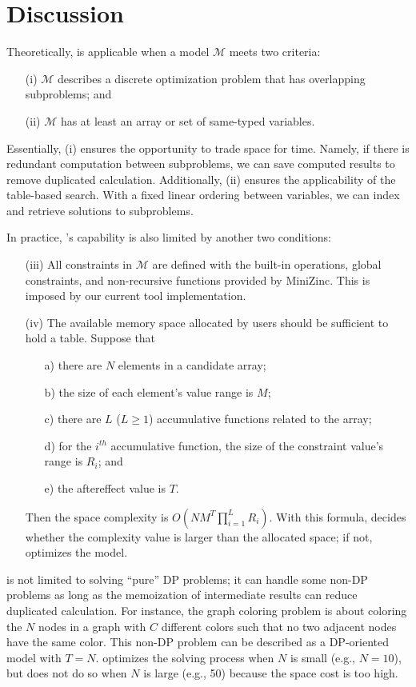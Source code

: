 \section{Discussion}

Theoretically, \tool is applicable when a model $\mathcal{M}$ meets two criteria:

\begin{enumerate}
\item[(i)] $\mathcal{M}$ describes a discrete optimization problem that has overlapping subproblems; and
\item[(ii)] $\mathcal{M}$ has at least an array or set of same-typed variables.
\end{enumerate}
Essentially, (i) ensures the opportunity to trade space for time. Namely, if there is redundant computation between subproblems, we can save computed results to remove duplicated calculation.
Additionally, (ii) ensures the applicability of the table-based search. With a fixed linear ordering between variables, we can index and retrieve solutions to subproblems.


In practice, \tool’s capability is also limited by another two conditions:

\begin{enumerate}
\item[(iii)] All constraints in $\mathcal{M}$ are defined with the built-in operations, global constraints, and non-recursive functions provided by MiniZinc. This is imposed by our current tool implementation.
\item[(iv)] The available memory space allocated by users should be sufficient to hold a table. Suppose that
\begin{itemize}
\item[a)] there are $N$ elements in a candidate array;
\item[b)] the size of each element's value range is $M$;
\item[c)] there are $L$ ($L \geq 1$) accumulative functions related to the array;
\item[d)] for the $i^{th}$ accumulative function, the size of the constraint value's range is $R_i$; and
\item[e)] the aftereffect value is $T$.
\end{itemize}
Then the space complexity is $O(N M^T \prod\limits_{i=1}^L R_i)$. With this formula, \tool decides whether the complexity value is larger than the allocated space; if not, \tool optimizes the model.
\end{enumerate}
\tool is not limited to solving ``pure'' DP problems; 
it can handle some non-DP problems as long as the memoization of intermediate results can reduce duplicated calculation. 
For instance, the graph coloring problem is about coloring the $N$ nodes in a graph with $C$ different colors such that no two adjacent nodes have the same color. 
This non-DP problem can be described as a DP-oriented model with $T=N$. \tool optimizes the solving process when $N$ is small (e.g., $N=10$), but does not do so when $N$ is large (e.g., 50) because the space cost is too high.

